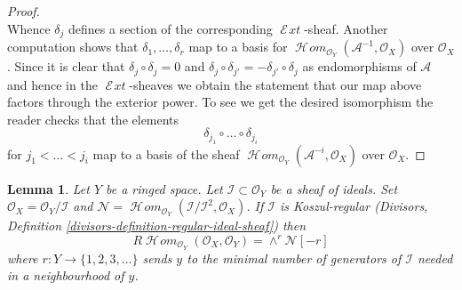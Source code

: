 \documentclass{stacks-project}
\theoremstyle{plain}
\newtheorem{lemma}[subsection]{Lemma}
\theoremstyle{definition}
\theoremstyle{remark}
\numberwithin{equation}{subsection}
\def\SheafHom{\mathop{\mathcal{H}\!\mathit{om}}\nolimits}
\def\SheafExt{\mathop{\mathcal{E}\!\mathit{xt}}\nolimits}
\begin{document}
\begin{proof}
$$$$
Whence $\delta_j$ defines a section of the corresponding
$\SheafExt$-sheaf.
Another computation shows that $\delta_1, \ldots, \delta_r$
map to a basis for $\SheafHom_{\mathcal{O}_Y}(\mathcal{A}^{-1}, \mathcal{O}_X)$
over $\mathcal{O}_X$.
Since it is clear that $\delta_j \circ \delta_j = 0$
and $\delta_j \circ \delta_{j'} = - \delta_{j'} \circ \delta_j$
as endomorphisms of $\mathcal{A}$ and hence in the
$\SheafExt$-sheaves
we obtain the statement that our map above factors through
the exterior power. To see we get the desired isomorphism
the reader checks that the elements
$$
\delta_{j_1} \circ \ldots \circ \delta_{j_i}
$$
for $j_1 < \ldots < j_i$ map to a basis of the sheaf
$\SheafHom_{\mathcal{O}_Y}(\mathcal{A}^{-i}, \mathcal{O}_X)$
over $\mathcal{O}_X$.
\end{proof}

\begin{lemma}
\label{lemma-regular-immersion-ext}
Let $Y$ be a ringed space. Let $\mathcal{I} \subset \mathcal{O}_Y$
be a sheaf of ideals. Set $\mathcal{O}_X = \mathcal{O}_Y/\mathcal{I}$ and
$\mathcal{N} =
\SheafHom_{\mathcal{O}_Y}(\mathcal{I}/\mathcal{I}^2, \mathcal{O}_X)$.
If $\mathcal{I}$ is Koszul-regular
(Divisors, Definition \ref{divisors-definition-regular-ideal-sheaf}) then
$$
R\SheafHom_{\mathcal{O}_Y}(\mathcal{O}_X, \mathcal{O}_Y) =
\wedge^r \mathcal{N}[-r]
$$
where $r : Y \to \{1, 2, 3, \ldots \}$ sends $y$ to
the minimal number of generators of $\mathcal{I}$ needed in a neighbourhood
of $y$.
\end{lemma}
\end{document}
